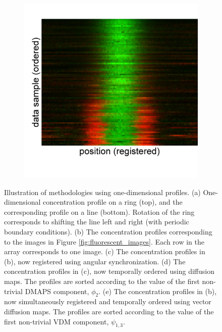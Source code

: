 \documentclass{pnastwo}
\begin{document}
\begin{figure}
\begin{subfigure}{0.2\textwidth}
\caption{}
\label{subfig:1d_aligned_ordered}
\end{subfigure}
\begin{subfigure}{0.2\textwidth}
\includegraphics[width=\textwidth]{registered_ordered_vdm_1d}
\caption{}
\label{subfig:1d_aligned_ordered_vdm}
\end{subfigure}
\caption{Illustration of methodologies using one-dimensional profiles. (a) One-dimensional concentration profile on a ring (top), and the corresponding profile on a line (bottom). Rotation of the ring corresponds to shifting the line left and right (with periodic boundary conditions). (b) The concentration profiles corresponding to the images in Figure \ref{fig:fluorescent_images}. Each row in the array corresponds to one image. (c) The concentration profiles in (b), now registered using angular synchronization. (d) The concentration profiles in (c), now temporally ordered using diffusion maps. The profiles are sorted according to the value of the first non-trivial DMAPS component, $\phi_2$. (e) The concentration profiles in (b), now simultaneously registered and temporally ordered using vector diffusion maps. The profiles are sorted according to the value of the first non-trivial VDM component, $\psi_{1, 3}$.}
\label{fig:1d_demo}
\end{figure}
\end{document}
